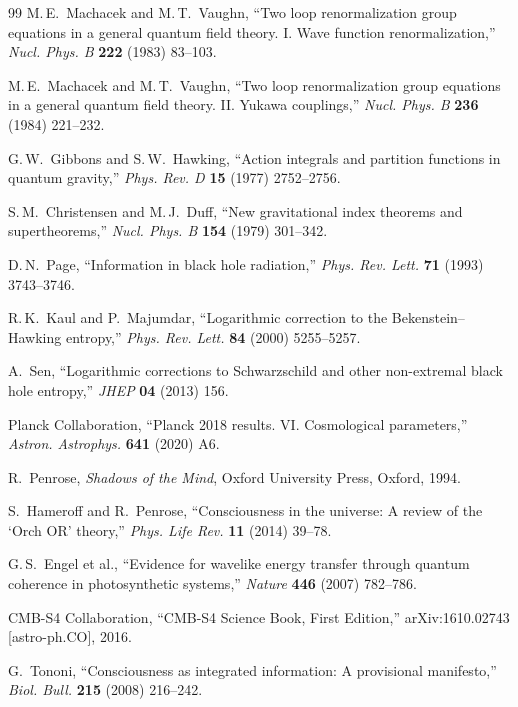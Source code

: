 \documentclass[11pt,a4paper]{article}
\theoremstyle{myrmk}
\begin{document}
\begin{thebibliography}{99}
M.\,E.~Machacek and M.\,T.~Vaughn,
``Two loop renormalization group equations in a general quantum field theory.
I. Wave function renormalization,''
\textit{Nucl. Phys. B} \textbf{222} (1983) 83--103.

M.\,E.~Machacek and M.\,T.~Vaughn,
``Two loop renormalization group equations in a general quantum field theory.
II. Yukawa couplings,''
\textit{Nucl. Phys. B} \textbf{236} (1984) 221--232.

G.\,W.~Gibbons and S.\,W.~Hawking,
``Action integrals and partition functions in quantum gravity,''
\textit{Phys. Rev. D} \textbf{15} (1977) 2752--2756.

S.\,M.~Christensen and M.\,J.~Duff,
``New gravitational index theorems and supertheorems,''
\textit{Nucl. Phys. B} \textbf{154} (1979) 301--342.

D.\,N.~Page,
``Information in black hole radiation,''
\textit{Phys. Rev. Lett.} \textbf{71} (1993) 3743--3746.

R.\,K.~Kaul and P.~Majumdar,
``Logarithmic correction to the Bekenstein--Hawking entropy,''
\textit{Phys. Rev. Lett.} \textbf{84} (2000) 5255--5257.

A.~Sen,
``Logarithmic corrections to Schwarzschild and other non-extremal black hole entropy,''
\textit{JHEP} \textbf{04} (2013) 156.

Planck Collaboration,
``Planck 2018 results. VI. Cosmological parameters,''
\textit{Astron. Astrophys.} \textbf{641} (2020) A6.

R.~Penrose, \textit{Shadows of the Mind},
Oxford University Press, Oxford, 1994.

S.~Hameroff and R.~Penrose,
``Consciousness in the universe: A review of the `Orch OR' theory,''
\textit{Phys. Life Rev.} \textbf{11} (2014) 39--78.

G.\,S.~Engel et al.,
``Evidence for wavelike energy transfer through quantum coherence in photosynthetic systems,''
\textit{Nature} \textbf{446} (2007) 782--786.

CMB-S4 Collaboration,
``CMB-S4 Science Book, First Edition,''
arXiv:1610.02743 [astro-ph.CO], 2016.

G.~Tononi,
``Consciousness as integrated information: A provisional manifesto,''
\textit{Biol. Bull.} \textbf{215} (2008) 216--242.

\end{thebibliography}
\end{document}
